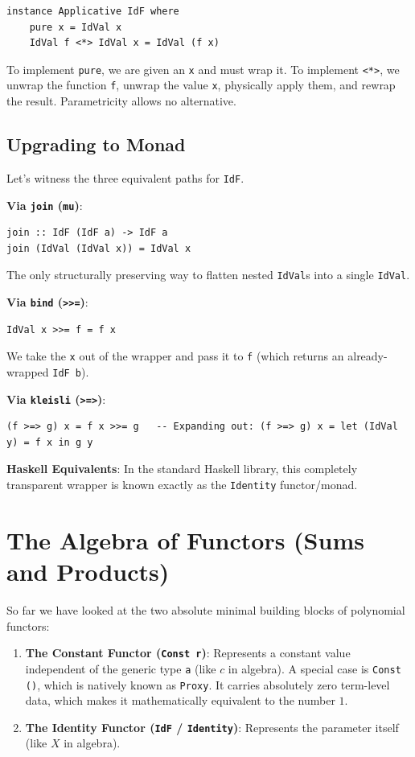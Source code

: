 \documentclass[12pt,a4paper]{article}
\begin{document}
\begin{lstlisting}
instance Applicative IdF where
    pure x = IdVal x
    IdVal f <*> IdVal x = IdVal (f x)
\end{lstlisting}
To implement \texttt{pure}, we are given an \texttt{x} and must wrap it. To implement \texttt{<*>}, we unwrap the function \texttt{f}, unwrap the value \texttt{x}, physically apply them, and rewrap the result. Parametricity allows no alternative.

\subsection{Upgrading to Monad}

Let's witness the three equivalent paths for \texttt{IdF}.

\textbf{Via \texttt{join} (\texttt{mu})}:
\begin{lstlisting}
join :: IdF (IdF a) -> IdF a
join (IdVal (IdVal x)) = IdVal x
\end{lstlisting}
The only structurally preserving way to flatten nested \texttt{IdVal}s into a single \texttt{IdVal}.

\textbf{Via \texttt{bind} (\texttt{>>=})}:
\begin{lstlisting}
IdVal x >>= f = f x
\end{lstlisting}
We take the \texttt{x} out of the wrapper and pass it to \texttt{f} (which returns an already-wrapped \texttt{IdF b}).

\textbf{Via \texttt{kleisli} (\texttt{>=>})}:
\begin{lstlisting}
(f >=> g) x = f x >>= g   -- Expanding out: (f >=> g) x = let (IdVal y) = f x in g y
\end{lstlisting}

\textbf{Haskell Equivalents}: In the standard Haskell library, this completely transparent wrapper is known exactly as the \texttt{Identity} functor/monad.

\section{The Algebra of Functors (Sums and Products)}

So far we have looked at the two absolute minimal building blocks of polynomial functors:
\begin{enumerate}
    \item \textbf{The Constant Functor (\texttt{Const r})}: Represents a constant value independent of the generic type \texttt{a} (like $c$ in algebra). A special case is \texttt{Const ()}, which is natively known as \texttt{Proxy}. It carries absolutely zero term-level data, which makes it mathematically equivalent to the number $1$.
    \item \textbf{The Identity Functor (\texttt{IdF} / \texttt{Identity})}: Represents the parameter itself (like $X$ in algebra).
\end{enumerate}
\end{document}
